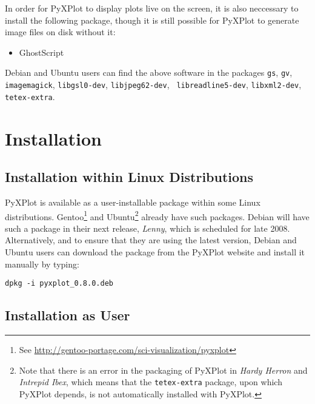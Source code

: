 \noindent In order for PyXPlot to display plots live on the screen, it is also neccessary to install the following package, though it is still possible for PyXPlot to generate image files on disk without it:

\vspace{0.5cm}
\begin{itemize}
\item GhostScript
\end{itemize}
\vspace{0.5cm}

Debian and Ubuntu users can find the above software in the packages {\tt gs},
{\tt gv}, {\tt imagemagick}, {\tt libgsl0-dev}, {\tt libjpeg62-dev}, {\tt
libreadline5-dev}, {\tt libxml2-dev}, {\tt tetex-extra}.

\section{Installation}

\subsection{Installation within Linux Distributions}

PyXPlot is available as a user-installable package within some Linux
distributions. Gentoo\footnote{See \url{http://gentoo-portage.com/sci-visualization/pyxplot}}
and Ubuntu\footnote{Note
that there is an error in the packaging of PyXPlot in {\it Hardy Herron} and
{\it Intrepid Ibex}, which means that the {\tt tetex-extra} package, upon which
PyXPlot depends, is not automatically installed with PyXPlot.} already have
such packages. Debian will have such a package in their next release, {\it
Lenny}, which is scheduled for late 2008. Alternatively, and to ensure that
they are using the latest version, Debian and Ubuntu users can download the
package from the PyXPlot website and install it manually by typing:

\begin{verbatim}
dpkg -i pyxplot_0.8.0.deb
\end{verbatim}

\subsection{Installation as User}

